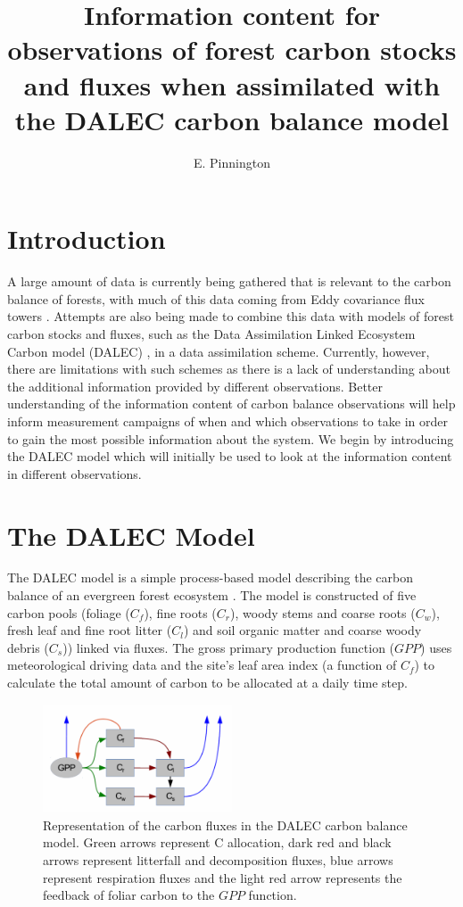 \documentclass[11pt]{article}
\title{Information content for observations of forest carbon stocks and fluxes when assimilated with the DALEC carbon balance model}
\author{\normalsize{E. Pinnington}}
\begin{document}
\maketitle

\section{Introduction}

A large amount of data is currently being gathered that is relevant to the carbon balance of forests, with much of this data coming from Eddy covariance flux towers \cite{baldocchi2008turner}. Attempts are also being made to combine this data with models of forest carbon stocks and fluxes, such as the Data Assimilation Linked Ecosystem Carbon model (DALEC) \cite{williams2005improved}, in a data assimilation scheme. Currently, however, there are limitations with such schemes as there is a lack of understanding about the additional information provided by different observations. Better understanding of the information content of carbon balance observations will help inform measurement campaigns of when and which observations to take in order to gain the most possible information about the system. We begin by introducing the DALEC model which will initially be used to look at the information content in different observations.

\section{The DALEC Model}

The DALEC model is a simple process-based model describing the carbon balance of an evergreen forest ecosystem \cite{williams2005improved}. The model is constructed of five carbon pools (foliage ($C_f$), fine roots ($C_r$), woody stems and coarse roots ($C_w$), fresh leaf and fine root litter ($C_l$) and soil organic matter and coarse woody debris ($C_s$)) linked via fluxes. The gross primary production function ($GPP$) uses meteorological driving data and the site's leaf area index (a function of $C_f$) to calculate the total amount of carbon to be allocated at a daily time step.   
\begin{figure}[h!]
    \centering
    \includegraphics[width=0.5\textwidth]{DALECpic.png}
    \caption{Representation of the carbon fluxes in the DALEC carbon balance model. Green arrows represent C allocation, dark red and black arrows represent litterfall and decomposition fluxes, blue arrows represent respiration fluxes and the light red arrow represents the feedback of foliar carbon to the $GPP$ function.  \cite{delahaies2013regularization}}
    \label{fig:DALEC_mod}
\end{figure}
\end{document}
